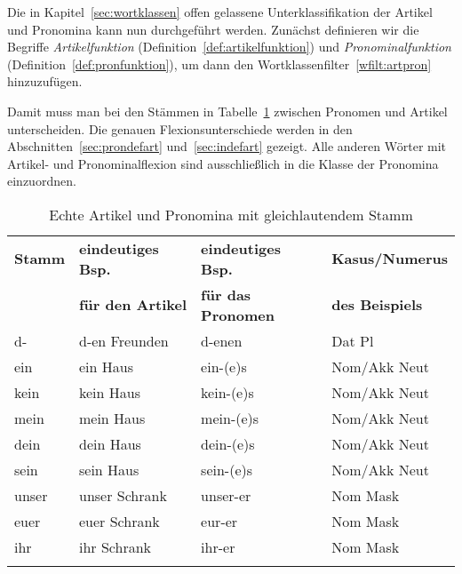 Die in Kapitel~\ref{sec:wortklassen} offen gelassene Unterklassifikation der Artikel und Pronomina kann nun durchgeführt werden.
Zunächst definieren wir die Begriffe \textit{Artikelfunktion} (Definition~\ref{def:artikelfunktion}) und \textit{Pronominalfunktion} (Definition~\ref{def:pronfunktion}), um dann den Wortklassenfilter~\ref{wfilt:artpron} hinzuzufügen.

\Enl


\Unstretch[1]




Damit muss man bei den Stämmen in Tabelle~\ref{tab:art} zwischen Pronomen und Artikel unterscheiden.
Die genauen Flexionsunterschiede werden in den Abschnitten~\ref{sec:prondefart} und~\ref{sec:indefart} gezeigt.
Alle anderen Wörter mit Artikel- und Pronominalflexion sind ausschließlich in die Klasse der Pronomina einzuordnen.

\begin{table}[!htbp]
  \centering
  \begin{tabular}{llll}
    \lsptoprule
    \textbf{Stamm} & \textbf{eindeutiges Bsp.} & \textbf{eindeutiges Bsp.} & \textbf{Kasus\slash Numerus} \\
    & \textbf{für den Artikel} & \textbf{für das Pronomen} & \textbf{des Beispiels} \\
    \midrule
    d- & d-en Freunden & d-enen & Dat Pl \\
    ein & ein Haus & ein-(e)s & Nom/Akk Neut \\
    kein & kein Haus & kein-(e)s & Nom/Akk Neut \\
    mein & mein Haus & mein-(e)s & Nom/Akk Neut \\
    dein & dein Haus & dein-(e)s & Nom/Akk Neut \\
    sein & sein Haus & sein-(e)s & Nom/Akk Neut \\
    unser & unser Schrank & unser-er & Nom Mask \\
    euer & euer Schrank & eur-er & Nom Mask \\
    ihr & ihr Schrank & ihr-er & Nom Mask \\
    \lspbottomrule
  \end{tabular}
  \caption{Echte Artikel und Pronomina mit gleichlautendem Stamm}
  \label{tab:art}
\end{table}

